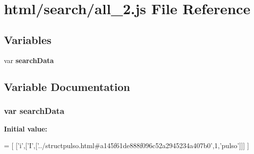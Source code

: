\section{html/search/all\+\_\+2.js File Reference}
\label{all__2_8js}
\subsection*{Variables}
\begin{DoxyCompactItemize}
\item 
var {\bf search\+Data}
\end{DoxyCompactItemize}


\subsection{Variable Documentation}
\subsubsection[{search\+Data}]{\setlength{\rightskip}{0pt plus 5cm}var search\+Data}\label{all__2_8js_ad01a7523f103d6242ef9b0451861231e}
{\bfseries Initial value\+:}
\begin{DoxyCode}
=
[
  [\textcolor{charliteral}{'i'},[\textcolor{charliteral}{'I'},[\textcolor{stringliteral}{'../structpulso.html#a145f61de888f096c52a2945234a407b0'},1,\textcolor{stringliteral}{'pulso'}]]]
]
\end{DoxyCode}
